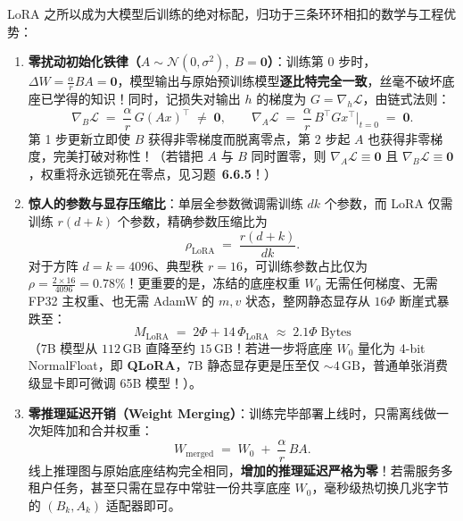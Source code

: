 LoRA 之所以成为大模型后训练的绝对标配，归功于三条环环相扣的数学与工程优势：
\begin{enumerate}
  \item \textbf{零扰动初始化铁律（$A \sim \mathcal{N}(0, \sigma^2),\; B = \mathbf{0}$）}：训练第 0 步时，$\Delta W = \frac{\alpha}{r} B A = \mathbf{0}$，模型输出与原始预训练模型\textbf{逐比特完全一致}，丝毫不破坏底座已学得的知识！同时，记损失对输出 $h$ 的梯度为 $G = \nabla_h \mathcal{L}$，由链式法则：
  \begin{equation}
    \nabla_B \mathcal{L} \;=\; \frac{\alpha}{r}\, G (A x)^\top \;\neq\; \mathbf{0}, \qquad
    \nabla_A \mathcal{L} \;=\; \frac{\alpha}{r}\, B^\top G x^\top \Big|_{t=0} \;=\; \mathbf{0}.
    \label{eq:lora-grad}
  \end{equation}
  第 1 步更新立即使 $B$ 获得非零梯度而脱离零点，第 2 步起 $A$ 也获得非零梯度，完美打破对称性！（若错把 $A$ 与 $B$ 同时置零，则 $\nabla_A \mathcal{L} \equiv \mathbf{0}$ 且 $\nabla_B \mathcal{L} \equiv \mathbf{0}$，权重将永远锁死在零点，见习题~\textbf{6.6.5}！）
  \item \textbf{惊人的参数与显存压缩比}：单层全参数微调需训练 $dk$ 个参数，而 LoRA 仅需训练 $r(d + k)$ 个参数，精确参数压缩比为
  \begin{equation}
    \rho_{\mathrm{LoRA}} \;=\; \frac{r(d + k)}{d k}.
    \label{eq:lora-ratio}
  \end{equation}
  对于方阵 $d = k = 4096$、典型秩 $r = 16$，可训练参数占比仅为 $\rho = \frac{2 \times 16}{4096} = \mathbf{0.78\%}$！更重要的是，冻结的底座权重 $W_0$ 无需任何梯度、无需 FP32 主权重、也无需 AdamW 的 $m, v$ 状态，整网静态显存从 $16\Phi$ 断崖式暴跌至：
  \[
    M_{\mathrm{LoRA}} \;=\; 2\Phi + 14\,\Phi_{\mathrm{LoRA}} \;\approx\; 2.1\Phi\;\text{Bytes}
  \]
  （7B 模型从 $112\,\mathrm{GB}$ 直降至约 $15\,\mathrm{GB}$！若进一步将底座 $W_0$ 量化为 4-bit NormalFloat，即 \textbf{QLoRA}，7B 静态显存更是压至仅 $\sim 4\,\mathrm{GB}$，普通单张消费级显卡即可微调 65B 模型！）。
  \item \textbf{零推理延迟开销（Weight Merging）}：训练完毕部署上线时，只需离线做一次矩阵加和合并权重：
  \begin{equation}
    W_{\mathrm{merged}} \;=\; W_0 \;+\; \frac{\alpha}{r}\, B A.
    \label{eq:lora-merge}
  \end{equation}
  线上推理图与原始底座结构完全相同，\textbf{增加的推理延迟严格为零}！若需服务多租户任务，甚至只需在显存中常驻一份共享底座 $W_0$，毫秒级热切换几兆字节的 $(B_k, A_k)$ 适配器即可。
\end{enumerate}

